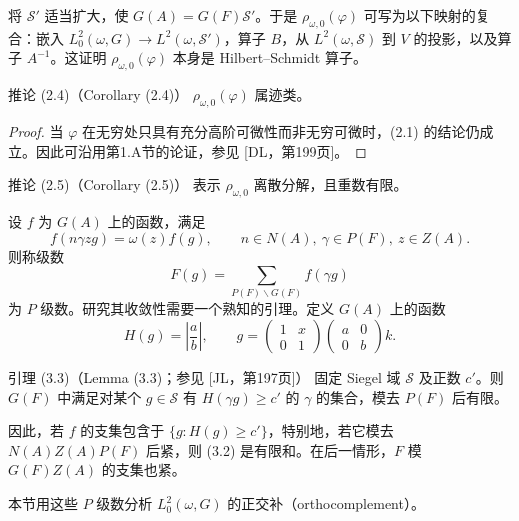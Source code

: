 将 $\mathcal S'$ 适当扩大，使 $G(A)=G(F)\mathcal S'$。于是 $\rho_{\omega,0}(\varphi)$ 可写为以下映射的复合：嵌入
$L_0^2(\omega,G)\to L^2(\omega,\mathcal S')$，算子 $B$，从
$L^2(\omega,\mathcal S)$ 到 $V$ 的投影，以及算子 $A^{-1}$。这证明
$\rho_{\omega,0}(\varphi)$ 本身是 Hilbert--Schmidt 算子。

\begin{originaltheorem}{推论 (2.4)（Corollary (2.4)）}
$\rho_{\omega,0}(\varphi)$ 属迹类。
\end{originaltheorem}
\begin{proof}
当 $\varphi$ 在无穷处只具有充分高阶可微性而非无穷可微时，(2.1) 的结论仍成立。因此可沿用第1.A节的论证，参见 [DL，第199页]。
\end{proof}
\begin{originaltheorem}{推论 (2.5)（Corollary (2.5)）}
表示 $\rho_{\omega,0}$ 离散分解，且重数有限。
\end{originaltheorem}

设 $f$ 为 $G(A)$ 上的函数，满足
\begin{equation}
 f(n\gamma zg)=\omega(z)f(g),\qquad
 n\in N(A),\ \gamma\in P(F),\ z\in Z(A).\tag{3.1}
\end{equation}
则称级数
\begin{equation}
 F(g)=\sum_{P(F)\backslash G(F)}f(\gamma g)\tag{3.2}
\end{equation}
为 $P$ 级数。研究其收敛性需要一个熟知的引理。定义 $G(A)$ 上的函数
\[
 H(g)=\left|\frac ab\right|,\qquad
 g=\begin{pmatrix}1&x\\0&1\end{pmatrix}\begin{pmatrix}a&0\\0&b\end{pmatrix}k.
\]
\begin{originaltheorem}{引理 (3.3)（Lemma (3.3)；参见 [JL，第197页]）}
固定 Siegel 域 $\mathcal S$ 及正数 $c'$。则 $G(F)$ 中满足对某个 $g\in\mathcal S$ 有
$H(\gamma g)\ge c'$ 的 $\gamma$ 的集合，模去 $P(F)$ 后有限。
\end{originaltheorem}
因此，若 $f$ 的支集包含于 $\{g:H(g)\ge c'\}$，特别地，若它模去
$N(A)Z(A)P(F)$ 后紧，则 (3.2) 是有限和。在后一情形，$F$ 模 $G(F)Z(A)$ 的支集也紧。

本节用这些 $P$ 级数分析 $L_0^2(\omega,G)$ 的正交补（orthocomplement）。

